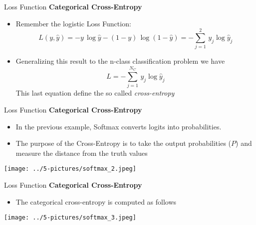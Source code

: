 \documentclass[11pt]{beamer}
\begin{document}
\begin{frame}{Loss Function}
\textbf{Categorical Cross-Entropy} 
\begin{itemize}
\item Remember the logistic Loss Function:
$$
L(y, \hat y) = - y \, \log \hat y - (1-y) \, \log(1-\hat y) = -\sum\limits_{j=1}^2 \, y_j \log \hat y_j
$$
\item Generalizing this result to the n-class classification problem we have
\begin{equation}
L = -\sum\limits_{j=1}^{N_C} \, y_j \log \hat y_j
\end{equation}
This last equation define the so called \textit{cross-entropy}
\end{itemize}
\end{frame}
\begin{frame}{Loss Function}
\textbf{Categorical Cross-Entropy} 
\begin{itemize}
\item In the previous example, Softmax converts logits into probabilities. 
\item The purpose of the Cross-Entropy is to take the output probabilities ($P$) and measure the distance from the truth values

\end{itemize}
\begin{center}
\texttt{[image: ../5-pictures/softmax\_2.jpeg]} 
\end{center}
\end{frame}
\begin{frame}{Loss Function}
\textbf{Categorical Cross-Entropy} 
\begin{itemize}
\item The categorical cross-entropy is computed as follows
\end{itemize}
\begin{center}
\texttt{[image: ../5-pictures/softmax\_3.jpeg]} 
\end{center}
\end{frame}
\end{document}

